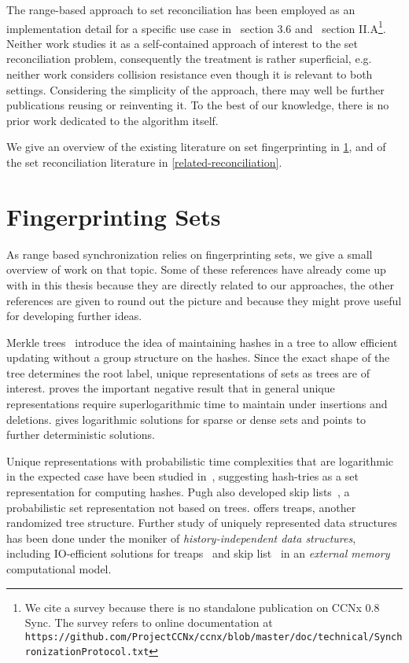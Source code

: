 
The range-based approach to set reconciliation has been employed as an implementation detail for a specific use case in~\cite{chen1999prototype} section 3.6 and~\cite{shang2017survey} section II.A\footnote{We cite a survey because there is no standalone publication on CCNx 0.8 Sync. The survey refers to online documentation at \texttt{https://github.com/ProjectCCNx/ccnx/blob/master/doc/technical/SynchronizationProtocol.txt}}. Neither work studies it as a self-contained approach of interest to the set reconciliation problem, consequently the treatment is rather superficial, e.g. neither work considers collision resistance even though it is relevant to both settings. Considering the simplicity of the approach, there may well be further publications reusing or reinventing it. To the best of our knowledge, there is no prior work dedicated to the algorithm itself.

We give an overview of the existing literature on set fingerprinting in \cref{related-fingerprinting}, and of the set reconciliation literature in \cref{related-reconciliation}.

\section{Fingerprinting Sets}
\label{related-fingerprinting}

As range based synchronization relies on fingerprinting sets, we give a small overview of work on that topic. Some of these references have already come up with in this thesis because they are directly related to our approaches, the other references are given to round out the picture and because they might prove useful for developing further ideas.

Merkle trees~\cite{merkle1989certified} introduce the idea of maintaining hashes in a tree to allow efficient updating without a group structure on the hashes. Since the exact shape of the tree determines the root label, unique representations of sets as trees are of interest. \cite{uniquerepresentation} proves the important negative result that in general unique representations require superlogarithmic time to maintain under insertions and deletions. \cite{sundar1994unique} gives logarithmic solutions for sparse or dense sets and points to further deterministic solutions.

Unique representations with probabilistic time complexities that are logarithmic in the expected case have been studied in~\cite{pugh1989incremental}, suggesting hash-tries as a set representation for computing hashes. Pugh also developed skip lists~\cite{pugh1990skip}, a probabilistic set representation not based on trees. \cite{seidel1996randomized} offers treaps, another randomized tree structure. Further study of uniquely represented data structures has been done under the moniker of \textit{history-independent data structures}, including IO-efficient solutions for treaps~\cite{golovin2009b} and skip list~\cite{bender2016anti} in an \textit{external memory} computational model.

